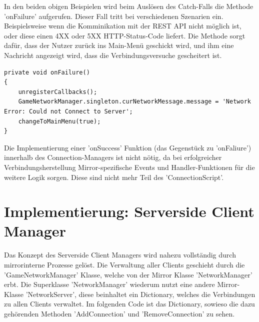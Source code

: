 In den beiden obigen Beispielen wird beim Auslösen des Catch-Falls die Methode 'onFailure' aufgerufen. Dieser Fall tritt bei verschiedenen Szenarien ein. Beispielsweise wenn die Komminikation mit der REST API nicht möglich ist, oder diese einen 4XX oder 5XX HTTP-Status-Code liefert. Die Methode sorgt dafür, dass der Nutzer zurück ins Main-Menü geschickt wird, und ihm eine Nachricht angezeigt wird, dass die Verbindungsversuche gescheitert ist.

\begin{lstlisting}[caption= ConnectionScript.cs onFailure()]
private void onFailure()
{
	unregisterCallbacks();
	GameNetworkManager.singleton.curNetworkMessage.message = 'Network Error: Could not Connect to Server';
	changeToMainMenu(true);
}

\end{lstlisting}

Die Implementierung einer 'onSuccess' Funktion (das Gegenstück zu 'onFaliure') innerhalb des Connection-Managers ist nicht nötig, da bei erfolgreicher Verbindungsherstellung Mirror-spezifische Events und Handler-Funktionen für die weitere Logik sorgen. Diese sind nicht mehr Teil des 'ConnectionScript'.

\section{Implementierung: Serverside Client Manager}

Das Konzept des Serverside Client Managers wird nahezu vollständig durch mirrorinterne Prozesse gelöst. Die Verwaltung aller Clients geschieht durch die 'GameNetworkManager' Klasse, welche von der Mirror Klasse 'NetworkManager' erbt. Die Superklasse 'NetworkManager' wiederum nutzt eine andere Mirror-Klasse 'NetworkServer', diese beinhaltet ein Dictionary, welches die Verbindungen zu allen Clients verwaltet. Im folgenden Code ist das Dictionary, sowieso die dazu gehörenden Methoden 'AddConnection' und 'RemoveConnection' zu sehen.

